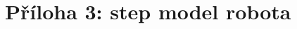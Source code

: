 \documentclass[a4paper, 12pt]{article}
\begin{document}
  \newpage

  \section{Příloha 3: \acrshort{step} model robota} \label{sec:STEP model robota}
\end{document}
